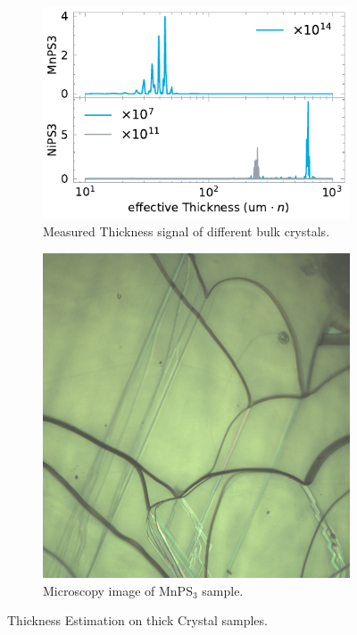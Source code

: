 \documentclass[
	oneside,
	parskip=half,
	a4paper,
]{scrbook}
\begin{document}
\begin{figure}
	\begin{subfigure}[c]{3.5in}
		\centering
		\includegraphics{../figures/2024-03-14 thickness.pdf}
		\caption{Measured Thickness signal of different bulk crystals.}
		\label{fig:thickness bulk}
	\end{subfigure}
	\begin{subfigure}[c]{.3\textwidth}
		\centering
		\includegraphics[width=\textwidth]{../../data/2023-11-02/i001_MnPS3_50x_a.png}
		\caption{Microscopy image of MnPS$_3$ sample.}
		\label{fig:thickness MnPS3}
	\end{subfigure}
	\caption{Thickness Estimation on thick Crystal samples.} 
\end{figure}
\end{document}
